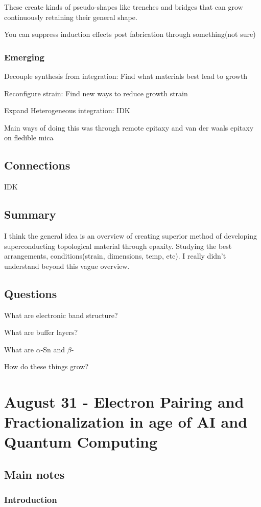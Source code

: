 These create kinds of pseudo-shapes like trenches and bridges that can grow continuously retaining their general shape.

You can suppress induction effects post fabrication through something(not sure)

\subsubsection{Emerging}
Decouple synthesis from integration: Find what materials best lead to growth

Reconfigure strain: Find new ways to reduce growth strain

Expand Heterogeneous integration: IDK

Main ways of doing this was through remote epitaxy and van der waals epitaxy on fledible mica
\subsection{Connections}
IDK

\subsection{Summary}
I think the general idea is an overview of creating superior method of developing superconducting topological material through epaxity. Studying the best arrangements, conditions(strain, dimensions, temp, etc). I really didn't understand beyond this vague overview.


\subsection{Questions}

What are electronic band structure?

What are buffer layers?

What are $\alpha$-Sn and $\beta$-

How do these things grow?



\section{August 31 - Electron Pairing and Fractionalization in age of AI and Quantum Computing}
\subsection{Main notes}
\subsubsection{Introduction}


